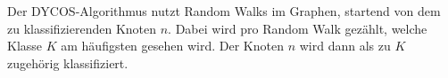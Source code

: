 Der DYCOS-Algorithmus nutzt Random Walks im Graphen, startend 
von dem zu klassifizierenden Knoten $n$. Dabei wird pro Random Walk
gezählt, welche Klasse $K$ am häufigsten gesehen wird. Der Knoten $n$
wird dann als zu $K$ zugehörig klassifiziert.
